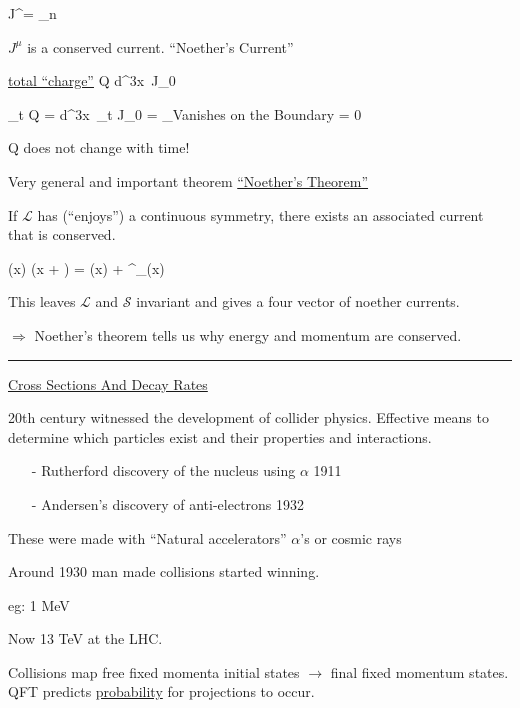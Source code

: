 {\be
J^\mu = \sum_n 
\ee

$J^\mu$ is a conserved current.  ``Noether's Current''


\underline{total ``charge''}
\be
Q \equiv \int d^3x\ J_0 
\ee


\be
\partial_t Q = \int d^3x\ \partial_t J_0 = _{\textrm{Vanishes on the Boundary}} = 0
\ee
 
Q does not change with time! 

Very general and important theorem \underline{``Noether's Theorem''}

If $\mathcal{L}$ has (``enjoys'') a continuous symmetry, there exists an associated current that is conserved. 

\be
\phi(x) \rightarrow \phi(x + \epsilon) = \phi(x) + \epsilon^\mu \partial_\mu \phi(x)
\ee

This leaves $\mathcal{L}$ and $\mathcal{S}$ invariant and gives a four vector of noether currents. 

$\Rightarrow$ Noether's theorem tells us why energy and momentum are conserved. 


\noindent\rule{\textwidth}{1pt}

\clearpage

\underline{\Large Cross Sections And Decay Rates}

20th century witnessed the development of collider physics. 
Effective means to determine which particles exist and their properties and interactions.

\begin{itemize}
\item[-] Rutherford discovery of the nucleus using $\alpha$ 1911 
\item[-] Andersen's discovery of anti-electrons 1932
\end{itemize}

These were made with ``Natural accelerators'' $\alpha$'s or cosmic rays

Around 1930 man made collisions started winning. 

eg: 1 MeV 

Now 13 TeV at the LHC.

Collisions map free fixed momenta initial states $\rightarrow$ final fixed momentum states. \\

QFT predicts \underline{probability} for projections to occur. 

}

